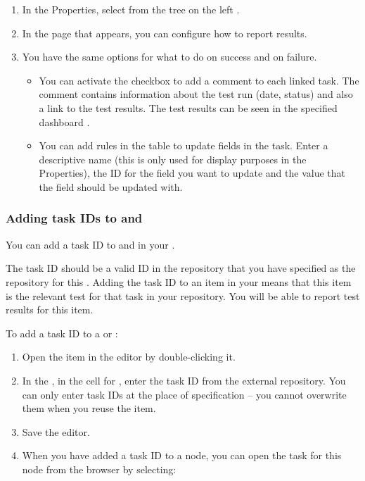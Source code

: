 \begin{enumerate}
\item In the \gdproject{} Properties, select  from the tree on the left .
\item In the page that appears, you can configure how to report results.
\item You have the same options for what to do on success and on failure.
\begin{itemize}
\item You can activate the checkbox to add a comment to each linked task. The comment contains information about the test run (date, status) and also a link to the test results. The test results can be seen in the specified dashboard .
\item You can add rules in the table to update fields in the task. Enter a descriptive name (this is only used for display purposes in the Properties), the ID for the field you want to update and the value that the field should be updated with. 
\end{itemize}

\end{enumerate}


\subsubsection{Adding task IDs to \gdsuites{} and \gdcases{}}
\label{TasksALMAddTask}

You can add a task ID to \gdcases{} and \gdsuites{} in your \gdproject{}. 

The task ID should be a valid ID in the repository that you have specified as the repository for this \gdproject{} . Adding the task ID to an item in your \gdproject{} means that this item is the relevant test for that task in your repository. You will be able to report test results for this item. 

To add a task ID to a \gdcase{} or \gdsuite{}:
\begin{enumerate}
\item Open the item in the editor by double-clicking it.
\item In the \gdpropview{}, in the cell for , enter the task ID from the external repository. You can only enter task IDs at the place of specification -- you cannot overwrite them when you reuse the item.
\item Save the editor. 
\item When you have added a task ID to a node, you can open the task for this node from the browser by selecting:\\
\end{enumerate}

